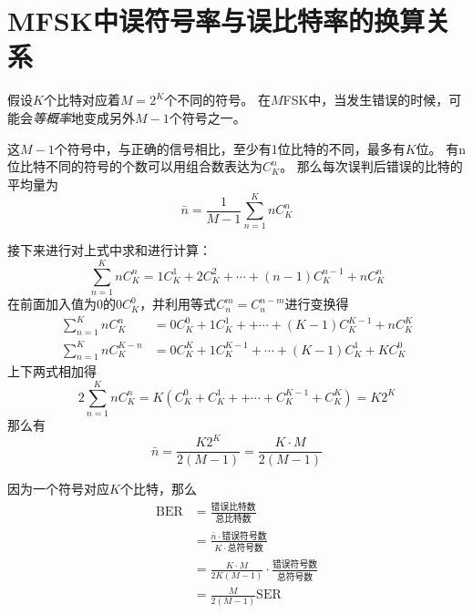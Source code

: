 \section{MFSK中误符号率与误比特率的换算关系}
\label{appendix:VIII}
    假设$K$个比特对应着$M=2^K$个不同的符号。
    在$M$FSK中，当发生错误的时候，可能会\emph{等概率}地变成另外$M-1$个符号之一。
    
    这$M-1$个符号中，与正确的信号相比，至少有1位比特的不同，最多有$K$位。
    有n位比特不同的符号的个数可以用组合数表达为$C_K^n$。
    那么每次误判后错误的比特的平均量为
    \begin{equation*}
        \bar{n}=\frac{1}{M-1}\sum_{n=1}^{K}nC_K^n
    \end{equation*}

    接下来进行对上式中求和进行计算：
    \begin{equation*}
            \sum_{n=1}^{K}nC_K^n=1C_K^1+2C_K^2+\cdots+(n-1)C_K^{n-1}+nC_K^n
    \end{equation*}
    在前面加入值为0的$0C_K^0$，并利用等式$C_n^m=C_n^{n-m}$进行变换得
    \begin{equation*}
        \begin{split}
            \sum_{n=1}^{K}nC_K^n&=0C_K^0+1C_K^1++\cdots+(K-1)C_K^{K-1}+nC_K^K\\
            \sum_{n=1}^{K}nC_K^{K-n}&=0C_K^K+1C_K^{K-1}+\cdots+(K-1)C_K^1+KC_K^0
        \end{split}
    \end{equation*}
    上下两式相加得
    \begin{equation*}
        2\sum_{n=1}^{K}nC_K^n=K\left(C_K^0+C_K^1++\cdots+C_K^{K-1}+C_K^K\right)=K2^K
    \end{equation*}
    那么有
    \begin{equation*}
        \bar{n}=\frac{K2^K}{2(M-1)}=\frac{K\cdot M}{2(M-1)}
    \end{equation*}

    因为一个符号对应$K$个比特，那么
    \begin{equation*}
        \begin{split}
            \text{BER}  &=\frac{\text{错误比特数}}{\text{总比特数}}\\
                        &=\frac{\bar{n}\cdot\text{错误符号数}}{K\cdot\text{总符号数}}\\
                        &=\frac{K\cdot M}{2K(M-1)}\cdot\frac{\text{错误符号数}}{\text{总符号数}}\\
                        &=\frac{M}{2(M-1)}\text{SER}
        \end{split}
    \end{equation*}




